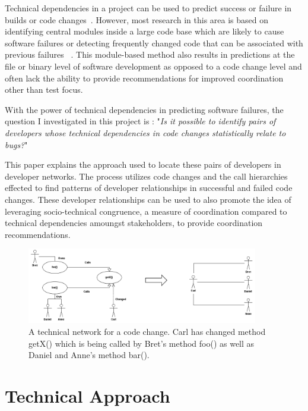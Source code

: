 \documentclass[conference]{IEEEtran}
\begin{document}
Technical dependencies in a project can be used to predict success or failure in
 builds or code changes~\cite{Pinzger:2008:DNP, Zimmermann:2008:PDU}. However, most 
research in this area is based on identifying
central modules inside a large code base which are likely to cause software failures or
detecting frequently changed code that can be associated with previous failures
~\cite{Kim:2006:AIB}. 
This module-based method also results in predictions 
at the file or binary level of software development as opposed to a code change level
and often lack the ability to provide recommendations for improved coordination
other than test focus.

With the power of technical dependencies in predicting software failures, the question I
investigated in this project is : 
"\textit{Is it possible to identify pairs of developers whose technical dependencies in code changes
statistically relate to bugs?}"

This paper explains the approach used to locate these pairs of developers in developer networks.
The process utilizes code changes and the call hierarchies effected  to find patterns of developer 
relationships in successful and failed code changes.  These developer relationships can be used
to also promote the idea of leveraging socio-technical congruence, a measure of coordination compared
to technical dependencies amoungst stakeholders, to provide coordination recommendations.

\begin{figure}[tb!]
\centering
\includegraphics[width=0.9\textwidth]{images/TecNetwork}
\caption{A technical network for a code change. Carl has changed method getX() which is being
called by Bret's method foo() as well as Daniel and Anne's method bar().\label{fig:network}}
\end{figure}

\section{Technical Approach}
\end{document}
